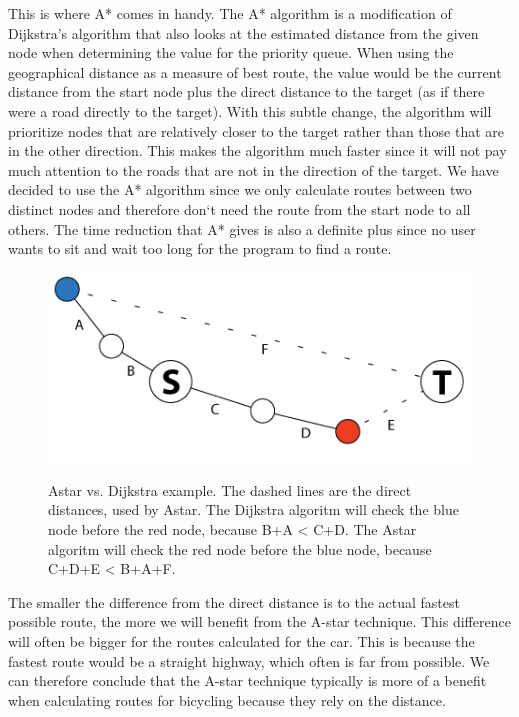 This is where A* comes in handy. The A* algorithm is a modification of Dijkstra's 
algorithm that also looks at the estimated distance from the given node when 
determining the value for the priority queue. When using the geographical distance 
as a measure of best route, the value would be the current distance from the start 
node plus the direct distance to the target (as if there were a road directly to 
the target). With this subtle change, the algorithm will prioritize nodes that are 
relatively closer to the target rather than those that are in the other
direction. This makes the algorithm much faster since it will not pay much attention 
to the roads that are not in the direction of the target.
We have decided to use the A* algorithm since we only calculate routes between 
two distinct nodes and therefore don`t need the route from the start node to all 
others. The time reduction that A* gives is also a definite plus since no user 
wants to sit and wait too long for the program to find a route.

\begin{figure}[!ht]
\centering
\includegraphics[width=1\linewidth]{images/AstarVSDijkstra.png}
\label{}
\caption{Astar vs. Dijkstra example. The dashed lines are the direct distances,
used by Astar. The Dijkstra algoritm will check the blue node before the red
node, because B+A < C+D. The Astar algoritm will check the red node before the
blue node, because C+D+E < B+A+F.}
\end{figure}

The smaller the difference from the direct distance is to the actual fastest
possible route, the more we will benefit from the A-star technique. This
difference will often be bigger for the routes calculated for the car. This is
because the fastest route would be a straight highway, which often is far from
possible. We can therefore conclude that the A-star technique typically is more
of a benefit when calculating routes for bicycling because they rely on the
distance.

